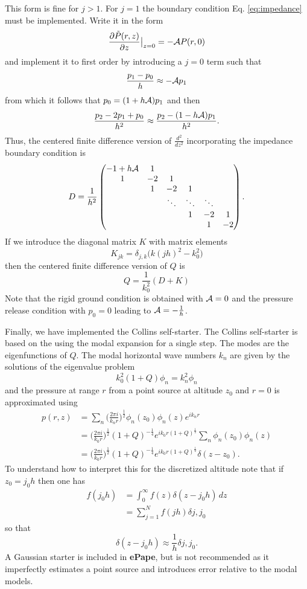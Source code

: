 This form is fine for $j>1$. For $j=1$ the boundary condition Eq. \ref{eq:impedance} must be implemented. Write it in the form 
\[
\frac{\partial \tilde P(r,z)}{\partial z}\big|_{z=0}=-{\cal A}P(r,0)
\]
and implement it to first order by introducing a $j=0$ term such that 
\[
\frac{p_1-p_0}{h}\approx -{\cal A}p_1
\]
from which it follows that $p_0=(1+h{\cal A})p_1$ and then 
\[
\frac{p_{2}-2p_1+p_0}{h^2}\approx \frac{p_{2}-(1-h{\cal A})p_1}{h^2}.
\]
Thus, the centered finite difference version of $\frac{d^2}{dz^2}$ incorporating the impedance boundary condition is 
\begin{equation}\label{eq:Discrete_d^2}
D=
\frac{1}{h^2}\begin{pmatrix}
-1+h{\cal A}&1& &&&\\
1&-2&1&&&\\
&1&-2&1&&\\
&&\ddots&\ddots&\ddots&\\
&&& 1&-2&1\\
&&& &1&-2
\end{pmatrix}.
\end{equation}
If we introduce the diagonal matrix $K$ with matrix elements 
\[
K_{jk}=\delta_{j,k} \Big(k(jh)^2-k_0^2)
\]
then the centered finite difference version of $Q$ is 
\begin{equation} 
Q=\frac{1}{k_0^2}(D+K)
\end{equation}
Note that the rigid ground condition is obtained with ${\cal A}=0$ and the pressure release condition with $p_0=0$ leading to ${\cal A}=-\frac{1}{h}$.

Finally, we have implemented the Collins self-starter\cite{collins1992self,collins1999stabilized}. The Collins self-starter is based on the using the modal expansion for a single step. The modes are the eigenfunctions of $Q$. The modal horizontal wave numbers $k_n$ are given by the solutions of the eigenvalue problem 
\[
k_0^2(1+Q)\phi_n=k_n^2 \phi_n 
\]
and the pressure at range $r$ from a point source at altitude $z_0$ and $r=0$ is approximated using 
\[
\begin{aligned}
p(r,z)&=\sum_n\Big(\frac{2\pi i}{k_n r}\Big)^{\frac{1}{2}} \phi_n(z_0) \phi_n(z) e^{ik_n r}\\
&=\Big(\frac{2\pi i}{k_0 r}\Big)^{\frac{1}{2}} (1+Q)^{-\frac{1}{4}} e^{ik_0 r (1+Q)^{\frac{1}{2}}} \sum_n \phi_n(z_0) \phi_n(z)\\
&=\Big(\frac{2\pi i}{k_0 r}\Big)^{\frac{1}{2}} (1+Q)^{-\frac{1}{4}} e^{ik_0 r (1+Q)^{\frac{1}{2}}} \delta(z-z_0). 
\end{aligned}
\]
To understand how to interpret this for the discretized altitude note that if $z_0=j_0h$ then one has 
\[
\begin{aligned}
f(j_0h)&=\int_0^\infty f(z)\delta(z-j_0h)\, dz \\
&= \sum_{j=1}^N f(jh) \delta{j,j_0} 
\end{aligned}
\]
so that 
\[
\delta(z-j_0h)\approx \frac{1}{h}\delta{j,j_0} .
\]
A Gaussian starter is included in {\bf ePape}, but is not recommended as it imperfectly estimates a point source and introduces error relative to the modal models. 

